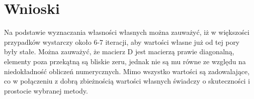 \documentclass{article}
\begin{document}
\section{Wnioski}
\begin{flushleft}
Na podstawie wyznaczania własności własnych można zauważyć, iż w większości przypadków
wystarczy około 6-7 iteracji, aby wartości własne już od tej pory były stałe. Można zauważyć, że macierz D jest macierzą prawie diagonalną,
elementy poza przekątną są bliskie zeru, jednak nie są mu równe ze względu na niedokładność obliczeń numerycznych. Mimo wszystko wartości są zadowalające, co w połączeniu z dobrą zbieżnością wartości własnych świadczy o skuteczności i prostocie wybranej metody.
\end{flushleft}
\end{document}
